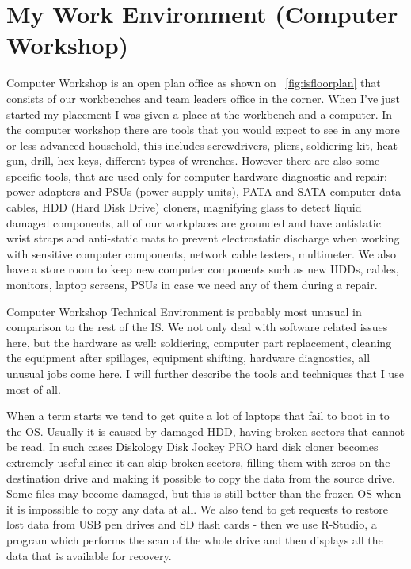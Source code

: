 \documentclass[10pt,a4paper,headinclude=true]{report}
\begin{document}
\section{My Work Environment (Computer Workshop)}
Computer Workshop is an open plan office as shown on ~\ref{fig:isfloorplan} that consists of our workbenches and team leaders office in the corner. When I've just started my placement I was given a place at the workbench and a computer. In the computer workshop there are tools that you would expect to see in any more or less advanced household, this includes screwdrivers, pliers, soldiering kit, heat gun, drill, hex keys, different types of wrenches. However there are also some specific tools, that are used only for computer hardware diagnostic and repair: power adapters and PSUs (power supply units), PATA and SATA computer data cables, HDD (Hard Disk Drive) cloners, magnifying glass to detect liquid damaged components, all of our workplaces are grounded and have antistatic wrist straps and anti-static mats to prevent electrostatic discharge when working with sensitive computer components, network cable testers, multimeter. We also have a store room to keep new computer components such as new HDDs, cables, monitors, laptop screens, PSUs in case we need any of them during a repair.    

Computer Workshop Technical Environment is probably most unusual in comparison to the rest of the IS. We not only deal with software related issues here, but the hardware as well: soldiering, computer part replacement, cleaning the equipment after spillages, equipment shifting, hardware diagnostics, all unusual jobs come here. I will further describe the tools and techniques that I use most of all. 

When a term starts we tend to get quite a lot of laptops that fail to boot in to the OS. Usually it is caused by damaged HDD, having broken sectors that cannot be read. In such cases Diskology Disk Jockey PRO hard disk cloner\cite{DiskCloner} becomes extremely useful since it can skip broken sectors, filling them with zeros on the destination drive and making it possible to copy the data from the source drive. Some files may become damaged, but this is still better than the frozen OS when it is impossible to copy any data at all. We also tend to get requests to restore lost data from USB pen drives and SD flash cards - then we use R-Studio, a program which performs the scan of the whole drive and then displays all the data that is available for recovery. 
\end{document}
